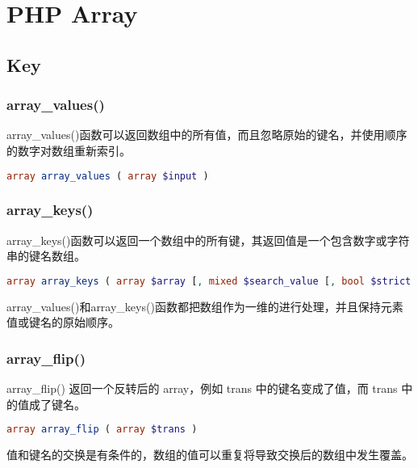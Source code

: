 \chapter{PHP Array}


\section{Key}

\subsection{array\_values()}

array\_values()函数可以返回数组中的所有值，而且忽略原始的键名，并使用顺序的数字对数组重新索引。

\begin{lstlisting}[language=PHP]
array array_values ( array $input )
\end{lstlisting}

\subsection{array\_keys()}

array\_keys()函数可以返回一个数组中的所有键，其返回值是一个包含数字或字符串的键名数组。



\begin{lstlisting}[language=PHP]
array array_keys ( array $array [, mixed $search_value [, bool $strict = false ]] )
\end{lstlisting}


array\_values()和array\_keys()函数都把数组作为一维的进行处理，并且保持元素值或键名的原始顺序。


\subsection{array\_flip()}

array_flip() 返回一个反转后的 array，例如 trans 中的键名变成了值，而 trans 中的值成了键名。


\begin{lstlisting}[language=PHP]
array array_flip ( array $trans )
\end{lstlisting}


值和键名的交换是有条件的，数组的值可以重复将导致交换后的数组中发生覆盖。

\begin{lstlisting}[language=PHP]

\end{lstlisting}

